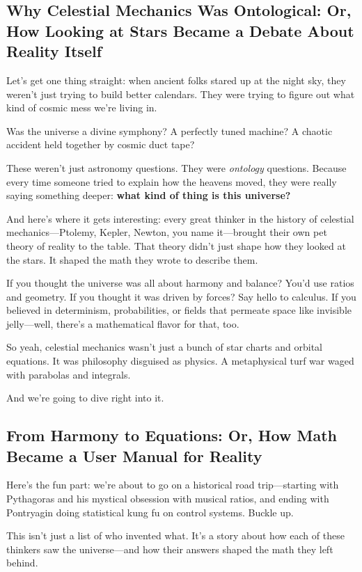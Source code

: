 \subsection{Why Celestial Mechanics Was Ontological: Or, How Looking at Stars Became a Debate About Reality Itself}

Let’s get one thing straight: when ancient folks stared up at the night sky, they weren’t just trying to build better calendars. They were trying to figure out what kind of cosmic mess we’re living in.

Was the universe a divine symphony? A perfectly tuned machine? A chaotic accident held together by cosmic duct tape? 

These weren’t just astronomy questions. They were \emph{ontology} questions. Because every time someone tried to explain how the heavens moved, they were really saying something deeper: \textbf{what kind of thing is this universe?}

And here’s where it gets interesting: every great thinker in the history of celestial mechanics—Ptolemy, Kepler, Newton, you name it—brought their own pet theory of reality to the table. That theory didn’t just shape how they looked at the stars. It shaped the math they wrote to describe them.

If you thought the universe was all about harmony and balance? You’d use ratios and geometry. If you thought it was driven by forces? Say hello to calculus. If you believed in determinism, probabilities, or fields that permeate space like invisible jelly—well, there’s a mathematical flavor for that, too.

So yeah, celestial mechanics wasn’t just a bunch of star charts and orbital equations. It was philosophy disguised as physics. A metaphysical turf war waged with parabolas and integrals.

And we’re going to dive right into it.


\subsection{From Harmony to Equations: Or, How Math Became a User Manual for Reality}

Here’s the fun part: we’re about to go on a historical road trip—starting with Pythagoras and his mystical obsession with musical ratios, and ending with Pontryagin doing statistical kung fu on control systems. Buckle up.

This isn’t just a list of who invented what. It’s a story about how each of these thinkers saw the universe—and how their answers shaped the math they left behind.

